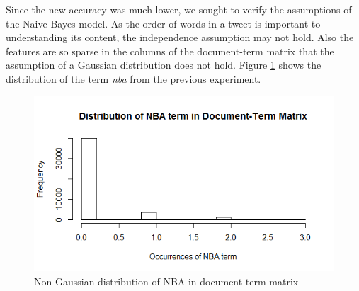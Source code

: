 \documentclass[journal, a4paper]{IEEEtran}
\begin{document}
Since the new accuracy was much lower, we sought to verify the assumptions of the Naive-Bayes model. As the order of words in a tweet is important to understanding its content, the independence assumption may not hold. Also the features are so sparse in the columns of the document-term matrix that the assumption of a Gaussian distribution does not hold. Figure \ref{fig:1} shows the distribution of the term \textit{nba} from the previous experiment.
\begin{figure}[!hbt]
	\centering
	\includegraphics[width=\columnwidth]{nba.png}
	\caption{Non-Gaussian distribution of NBA in document-term matrix}
	\label{fig:1}
\end{figure}
\end{document}
